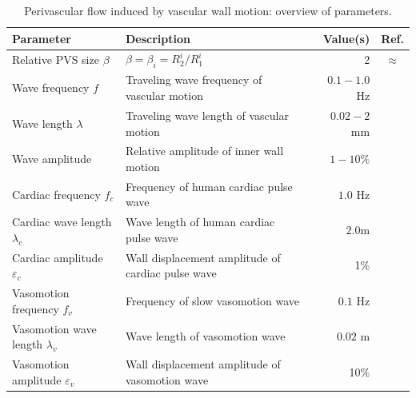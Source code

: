 \documentclass[fleqn,10pt]{wlscirep}
\begin{document}
\begin{table}
\centering
  \small
  \begin{tabular}{llrc}
    \toprule
    Parameter & Description & Value(s)  & Ref.\\ 
    \midrule
    Relative PVS size $\beta$ & $\beta = \beta_i = R_2^i / R_1^i$ & 2 & $\approx$\cite{eide2024functional} \\
    Wave frequency $f$ & Traveling wave frequency of vascular motion & $0.1-1.0$ Hz & \cite{gjerde2023directional} \\
    Wave length $\lambda$ & Traveling wave length of vascular motion & $0.02-2$ mm & \cite{broggini2024long, gjerde2023directional} \\
    Wave amplitude & Relative amplitude of inner wall motion & $1-10\%$ & \cite{gjerde2023directional} \\
    \midrule
    Cardiac frequency $f_c$ & Frequency of human cardiac pulse wave  & $1.0$ Hz & \cite{jung2021novel} \\
    Cardiac wave length $\lambda_c$ & Wave length of human cardiac pulse wave & $2.0$m & \\
    Cardiac amplitude $\varepsilon_c$ & Wall displacement amplitude of cardiac pulse wave & 1\%  & \\
    \midrule
    Vasomotion frequency $f_v$ & Frequency of slow vasomotion wave  & $0.1$ Hz & \cite{jung2021novel} \\
    Vasomotion wave length $\lambda_v$ & Wave length of vasomotion wave & $0.02$ m & \cite{broggini2024long, gjerde2023directional} \\
    Vasomotion amplitude $\varepsilon_v$ & Wall displacement amplitude of vasomotion wave & 10\%  & \cite{broggini2024long, gjerde2023directional}\\
    \bottomrule
  \end{tabular}
  \caption{Perivascular flow induced by vascular wall motion: overview of parameters.}
  \label{tab:pvs:parameters}
\end{table}


\end{document}

